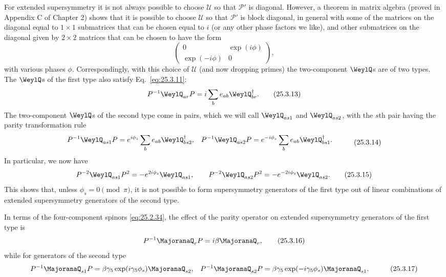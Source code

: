 For extended supersymmetry it is not always possible to choose \(\mathcal U\)
so that \(\mathcal P'\) is diagonal. However, a theorem in matrix algebra
(proved in Appendix C of Chapter 2) shows that it is possible to choose
\(\mathcal U\) so that \(\mathcal P'\) is block diagonal, in general with
some of the matrices on the diagonal equal to \(1\times1\) submatrices that
can be chosen equal to \(i\) (or any other phase factors we like), and other
submatrices on the diagonal given by \(2\times2\) matrices that can be chosen
to have the form
\[
\begin{pmatrix}
0&\exp(i\phi)\\
\exp(-i\phi)&0
\end{pmatrix},
\]
with various phases \(\phi\). Correspondingly, with this choice of
\(\mathcal U\) (and now dropping primes) the two-component \(\WeylQ\)s are of
two types. The \(\WeylQ\)s of the first type also satisfy
Eq.~\eqref{eq:25.3.11}:
\begin{equation}
P^{-1}\WeylQ_{ar}P
=i\sum_b e_{ab}\WeylQ_{br}^\dagger.
\tag{25.3.13}\label{eq:25.3.13}
\end{equation}
The two-component \(\WeylQ\)s of the second type come in pairs, which we will
call \(\WeylQ_{as1}\) and \(\WeylQ_{as2}\), with the \(s\)th pair having the
parity transformation rule
\begin{equation}
\begin{aligned}
P^{-1}\WeylQ_{as1}P
&=e^{i\phi_s}\sum_b e_{ab}\WeylQ_{bs2}^{\dagger},
&
P^{-1}\WeylQ_{as2}P
&=e^{-i\phi_s}\sum_b e_{ab}\WeylQ_{bs1}^{\dagger}.
\end{aligned}
\tag{25.3.14}\label{eq:25.3.14}
\end{equation}
In particular, we now have
\begin{equation}
P^{-2}\WeylQ_{as1}P^2=-e^{2i\phi_s}\WeylQ_{as1},
\qquad
P^{-2}\WeylQ_{as2}P^2=-e^{-2i\phi_s}\WeylQ_{as2}.
\tag{25.3.15}\label{eq:25.3.15}
\end{equation}
This shows that, unless \(\phi_s=0\pmod{\pi}\), it is not possible to form
supersymmetry generators of the first type out of linear combinations of
extended supersymmetry generators of the second type.

In terms of the four-component spinors \eqref{eq:25.2.34}, the effect of the
parity operator on extended supersymmetry generators of the first type is
\begin{equation}
P^{-1}\MajoranaQ_rP=i\beta\MajoranaQ_r,
\tag{25.3.16}\label{eq:25.3.16}
\end{equation}
while for generators of the second type
\begin{equation}
\begin{aligned}
P^{-1}\MajoranaQ_{s1}P
&=\beta\gamma_5\exp(i\gamma_5\phi_s)\MajoranaQ_{s2},
&
P^{-1}\MajoranaQ_{s2}P
&=\beta\gamma_5\exp(-i\gamma_5\phi_s)\MajoranaQ_{s1}.
\end{aligned}
\tag{25.3.17}\label{eq:25.3.17}
\end{equation}

